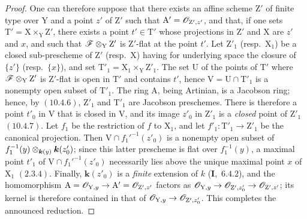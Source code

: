 \begin{proof}
One can therefore suppose that there exists an affine scheme $\mathrm{Z}'$ of finite type over $\mathrm{Y}$ and a
point $z'$ of $\mathrm{Z}'$ such that $\mathrm{A}'=\mathscr{O}_{\mathrm{Z}',z'}$, and that, if one sets $\mathrm{T}'=\mathrm{X}\times_\mathrm{Y}\mathrm{Z}'$, there exists a point
$t'\in\mathrm{T}'$ whose projections in $\mathrm{Z}'$ and $\mathrm{X}$ are $z'$ and $x$, and such that $\mathscr{F}\otimes_\mathrm{Y}\mathrm{Z}'$ is $\mathrm{Z}'$-flat at the
point $t'$. Let $\mathrm{Z}'_1$ (resp.\ $\mathrm{X}_1$) be a closed sub-prescheme of $\mathrm{Z}'$ (resp.\ $\mathrm{X}$) having for underlying space
the closure of $\{z'\}$ (resp.\ $\{x\}$), and set $\mathrm{T}'_1=\mathrm{X}_1\times_\mathrm{Y}\mathrm{Z}'_1$. The set $\mathrm{U}$ of the
points of $\mathrm{T}'$ where $\mathscr{F}\otimes_\mathrm{Y}\mathrm{Z}'$ is $\mathrm{Z}'$-flat is open in $\mathrm{T}'$  and contains $t'$, hence
$\mathrm{V}=\mathrm{U}\cap\mathrm{T}'_1$ is a nonempty open subset of $\mathrm{T}'_1$. The ring $\mathrm{A}$, being Artinian, is a Jacobson
ring; hence, by $(10.4.6)$, $\mathrm{Z}'_1$ and $\mathrm{T}'_1$ are Jacobson preschemes. There is therefore
a point $t'_0$ in $\mathrm{V}$ that is closed in $\mathrm{V}$, and its image $z'_0$ in $\mathrm{Z}'_1$ is a \emph{closed} point of $\mathrm{Z}'_1$ $(10.4.7)$.
Let $f_1$ be the restriction of $f$ to $\mathrm{X}_1$, and let $f'_1:\mathrm{T}'_1\to\mathrm{Z}'_1$ be the canonical projection. Then
$\mathrm{V}\cap f_1'^{-1}(z'_0)$ is a nonempty open subset of
$f_1^{-1}(y)\otimes_{\boldsymbol{k}(y)}\boldsymbol{k}(z'_0)$; since this latter prescheme is flat over $f_1^{-1}(y)$, a maximal point $t'_1$ of
$\mathrm{V}\cap f_1'^{-1}(z'_0)$ necessarily lies above the unique maximal point $x$ of $\mathrm{X}_1$ $(2.3.4)$.
Finally, $\boldsymbol{k}(z'_0)$ is a \emph{finite} extension of $k$ (\textbf{I},~$6.4.2$), and the homomorphism
$\mathrm{A}=\mathscr{O}_{\mathrm{Y},y}\to\mathrm{A}'=\mathscr{O}_{\mathrm{Z}',z'}$ factors as
$\mathscr{O}_{\mathrm{Y},y}\to\mathscr{O}_{\mathrm{Z}',z'_0}\to\mathscr{O}_{\mathrm{Z}',z'}$; its kernel is therefore contained in that of
$\mathscr{O}_{\mathrm{Y},y}\to\mathscr{O}_{\mathrm{Z}',z'_0}$. This completes the announced reduction.


\end{proof}
